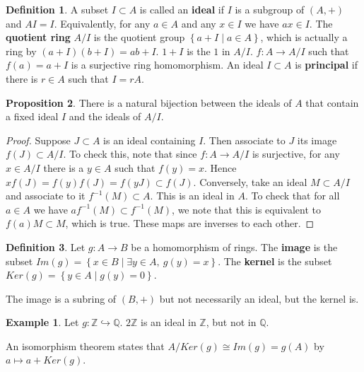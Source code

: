 \documentclass{article}
\newcommand{\Z}{\mathbb{Z}}
\newcommand{\Q}{\mathbb{Q}}
\newcommand{\rb}[1]{\left( #1 \right)}
\newcommand{\cb}[1]{\left\{ #1 \right\}}
\theoremstyle{definition}\newtheorem{definition}{Definition}[section]
\theoremstyle{definition}\newtheorem{remark}[definition]{Remark}
\theoremstyle{definition}\newtheorem*{example}{Example}
\theoremstyle{definition}\newtheorem*{note}{Note}
\newtheorem{proposition}[definition]{Proposition}
\begin{document}
\begin{definition}
A subset $ I \subset A $ is called an \textbf{ideal} if $ I $ is a subgroup of $ \rb{A, +} $ and $ AI = I $. Equivalently, for any $ a \in A $ and any $ x \in I $ we have $ ax \in I $. The \textbf{quotient ring} $ A / I $ is the quotient group $ \cb{a + I \mid a \in A} $, which is actually a ring by $ \rb{a + I}\rb{b + I} = ab + I $. $ 1 + I $ is the $ 1 $ in $ A / I $. $ f : A \to A / I $ such that $ f\rb{a} = a + I $ is a surjective ring homomorphism. An ideal $ I \subset A $ is \textbf{principal} if there is $ r \in A $ such that $ I = rA $.
\end{definition}

\begin{proposition}
There is a natural bijection between the ideals of $ A $ that contain a fixed ideal $ I $ and the ideals of $ A / I $.
\end{proposition}

\begin{proof}
Suppose $ J \subset A $ is an ideal containing $ I $. Then associate to $ J $ its image $ f\rb{J} \subset A / I $. To check this, note that since $ f : A \to A / I $ is surjective, for any $ x \in A / I $ there is a $ y \in A $ such that $ f\rb{y} = x $. Hence $ xf\rb{J} = f\rb{y}f\rb{J} = f\rb{yJ} \subset f\rb{J} $. Conversely, take an ideal $ M \subset A / I $ and associate to it $ f^{-1}\rb{M} \subset A $. This is an ideal in $ A $. To check that for all $ a \in A $ we have $ af^{-1}\rb{M} \subset f^{-1}\rb{M} $, we note that this is equivalent to $ f\rb{a}M \subset M $, which is true. These maps are inverses to each other.
\end{proof}

\begin{definition}
Let $ g : A \to B $ be a homomorphism of rings. The \textbf{image} is the subset $ Im\rb{g} = \cb{x \in B \mid \exists y \in A, \ g\rb{y} = x} $. The \textbf{kernel} is the subset $ Ker\rb{g} = \cb{y \in A \mid g\rb{y} = 0} $.
\end{definition}

The image is a subring of $ \rb{B, +} $ but not necessarily an ideal, but the kernel is.

\begin{example}
Let $ g : \Z \hookrightarrow \Q $. $ 2\Z $ is an ideal in $ \Z $, but not in $ \Q $.
\end{example}

An isomorphism theorem states that $ A / Ker\rb{g} \cong Im\rb{g} = g\rb{A} $ by $ a \mapsto a + Ker\rb{g} $.
\end{document}
